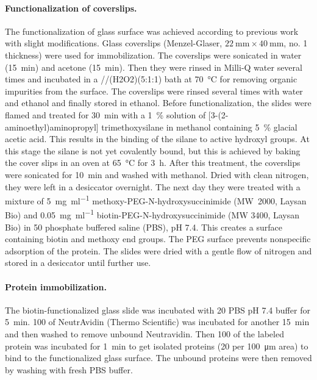 \documentclass[journal=jacsat,manuscript=article]{achemso}
\begin{document}
\paragraph*{Functionalization of coverslips.}
The functionalization of glass surface was achieved according to previous work with slight modifications.\cite{gupta2012involvement}
Glass coverslips (Menzel-Glaser, $\SI{22}{\mm} \times \SI{40}{\mm}$, no. 1 thickness) were used for immobilization.
The coverslips were sonicated in water (\SI{15}{\minute}) and acetone (\SI{15}{\minute}).
Then they were rinsed in Milli-Q water several times and incubated in a //\ce(H2O2)(5:1:1) bath at \SI{70}{\celsius} for removing organic impurities from the surface.
The coverslips were rinsed several times with water and ethanol and finally stored in ethanol.
Before functionalization, the slides were flamed and treated for \SI{30}{\minute} with a \SI{1}{\percent} solution of [3-(2-aminoethyl)aminopropyl] trimethoxysilane in methanol containing \SI{5}{\percent} glacial acetic acid. This results in the binding of the silane to active hydroxyl groups.
At this stage the silane is not yet covalently bound, but this is achieved by baking the cover slips in an oven at \SI{65}{\celsius} for \SI{3}{\hour}.
After this treatment, the coverslips were sonicated for \SI{10}{\minute} and washed with methanol.
Dried with clean nitrogen, they were left in a desiccator overnight. 
The next day they were treated with a mixture of \SI{5}{\mg\per\ml} methoxy-PEG-N-hydroxysuccinimide (MW~2000, Laysan Bio) and \SI{0.05}{\mg\per\ml} biotin-PEG-N-hydroxysuccinimide (MW 3400, Laysan Bio) in \SI{50}{\mM} phosphate buffered saline (PBS), pH 7.4.
This creates a surface containing biotin and methoxy end groups.
The PEG surface prevents nonspecific adsorption of the protein.
The slides were dried with a gentle flow of nitrogen and stored in a desiccator until further use.

\paragraph*{Protein immobilization.}
The biotin-functionalized glass slide was incubated with \SI{20}{\mM} PBS pH 7.4 buffer for \SI{5}{\minute}.
\SI{100}{\nM} of NeutrAvidin (Thermo Scientific) was incubated for another \SI{15}{\minute} and then washed to remove unbound Neutravidin. 
Then \SI{100}{\pM} of the labeled protein was incubated for \SI{1}{\minute} to get isolated proteins (20 per \SI{100}{\um} area) to bind to the functionalized glass surface.
The unbound proteins were then removed by washing with fresh PBS buffer.
\end{document}
